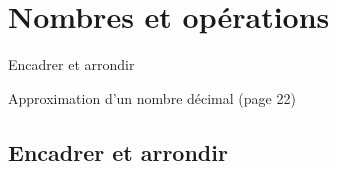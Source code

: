 \documentclass[a4paper,11pt]{report}
\begin{document}
\newcommand{\chapterName}{Nombres et opérations}
\newcommand{\serieName}{Encadrer et arrondir}


\chapter*{\chapterName}
\thispagestyle{empty}

\begin{amL}{\serieName}{
\item  Approximation d’un nombre décimal (page 22)
}
\end{amL}
\section*{\serieName}
\setcounter{page}{1}
\thispagestyle{firstPage}



\end{document}
